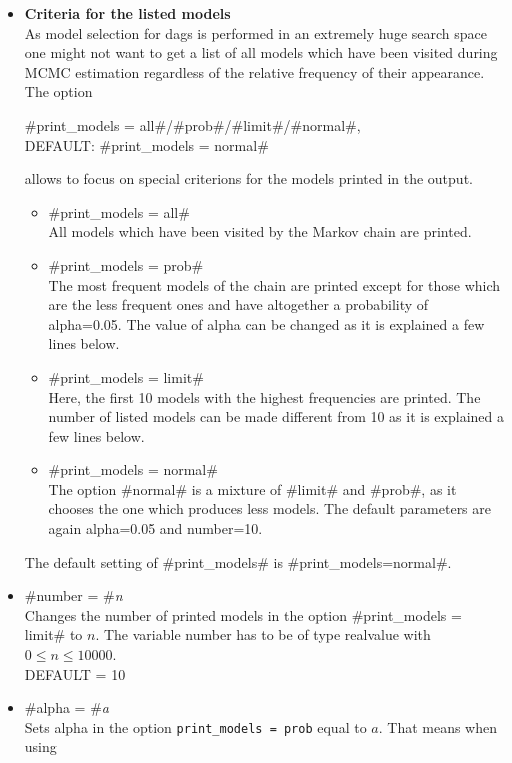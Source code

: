 \begin{itemize}
\item {\bf\sffamily Criteria for the listed models} \\
    As model selection for dags is performed in an extremely huge search space one might not want
    to get a list of all models which have been visited during MCMC estimation regardless of the
    relative frequency of their appearance. The option
    \begin{center}
    #print_models = all#/#prob#/#limit#/#normal#, \\
    \hspace*{-1.8cm}  DEFAULT: #print_models = normal#
    \end{center}
    allows to focus
    on special criterions for the models printed in the output.
\begin{itemize}
\item #print_models = all#  \\
    All models which have been visited by the Markov chain are printed.
\item #print_models = prob# \\
    The most frequent models of the chain are printed except for those which are the less frequent
    ones and have altogether a probability of alpha=0.05. The value of alpha can be changed as
    it is explained a few lines below.
\item #print_models = limit# \\
    Here, the first 10 models with the highest frequencies are printed. The number of listed models
    can be made different from 10 as it is explained a few lines below.
\item #print_models = normal# \\
    The option #normal# is a mixture of #limit# and #prob#, as it chooses the one
    which produces less models. The default parameters are again alpha=0.05 and number=10.
\end{itemize}
The default setting of  #print_models# is #print_models=normal#.
\item #number = #{\em n} \\
    Changes the number of printed models in the option  #print_models = limit# to $n$.
    The variable number has to be of type realvalue with $0 \leq n \leq 10000$. \\
    DEFAULT = 10
\item #alpha = #{\em a} \\
    Sets alpha in the option {\tt print\_models = prob} equal to $a$. That means when using

\end{itemize}
